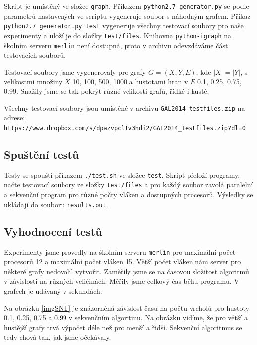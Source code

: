 \documentclass[a4paper, 11pt, titlepage, final]{article}[3. prosinec 2011]
\begin{document}
Skript je umístěný ve složce \texttt{graph}. Příkazem \texttt{python2.7 generator.py} se podle parametrů nastavených ve scriptu vygeneruje soubor s náhodným grafem. Příkaz \texttt{python2.7 generator.py test} vygeneruje všechny testovací soubory pro naše experimenty a uloží je do složky \texttt{test/files}. Knihovna \texttt{python-igraph} na školním serveru \texttt{merlin} není dostupná, proto v archivu odevzdáváme část testovacích souborů.

Testovací soubory jsme vygenerovaly pro grafy $G=(X,Y,E)$, kde $|X|=|Y|$, s velikostmi množiny $X$ 10, 100, 500, 1000 a hustotami hran v $E$ 0.1, 0.25, 0.75, 0.99. Snažily jsme se tak pokrýt různé velikosti grafů, řídké i husté.

Všechny testovací soubory jsou umístěné v archivu \texttt{GAL2014\_testfiles.zip} na adrese:
{
\centering
\texttt{https://www.dropbox.com/s/dpazvpcltv3hdi2/GAL2014\_testfiles.zip?dl=0}
}

\subsection{Spuštění testů}

Testy se spouští příkazem \texttt{./test.sh} ve složce \texttt{test}. Skript přeloží programy, načte testovací soubory ze složky \texttt{test/files} a pro každý soubor zavolá paralelní a sekvenční program pro různé počty vláken a dostupných procesorů. Výsledky se ukládají do souboru \texttt{results.out}.

\subsection{Vyhodnocení testů}

Experimenty jsme provedly na školním serveru \texttt{merlin} pro maximální počet procesorů 12 a maximální počet vláken 15. Větší počet vláken nám server pro některé grafy nedovolil vytvořit. Zaměřily jsme se na časovou složitost algoritmů v závislosti na různých veličinách. Měřily jsme celkový čas běhu programu. V grafech je udávaný v sekundách.


Na obrázku \ref{imgSNT} je znázorněná závislost času na počtu vrcholů pro hustoty 0.1, 0.25, 0.75 a 0.99 v sekvenčním algoritmu. Na obrázku vidíme, že pro větší a hustější grafy trvá výpočet déle než pro menší a řidší. Sekvenční algoritmus se tedy chová tak, jak jsme očekávaly.
\end{document}
